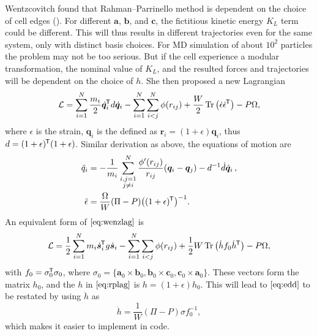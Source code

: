 Wentzcovitch found that Rahman--Parrinello method is dependent on
the choice of cell edges (\cite{Wentzcovitch:1991ka}).
For different $\bm{a}$, $\bm{b}$, and
$\bm{c}$, the fictitious kinetic energy $K_L$ term could be different.
This will thus results in different trajectories even for the same system,
only with distinct basis choices.
For MD simulation of about $10^2$ particles the problem may
not be too serious. But if the cell experience a modular transformation,
the nominal value of $K_L$, and the resulted forces and trajectories
will be dependent on the choice of $h$. She then proposed a new Lagrangian
\begin{equation}\label{eq:wenzlag}
	\mathcal{L} = \sum_{i=1}^{N} \frac{ m_i }{ 2 }\dot{ \bm{q} }_i^{\mkern-1.5mu\mathsf{T}} d \dot{ \bm{q} }_i
	- \sum_{i=1}^{N} \sum_{i<j}^{N} \phi(r_{ij}) + \frac{ W }{ 2 }
	\Tr \big( \dot{ \epsilon } \dot{ \epsilon }^{\mkern-1.5mu\mathsf{T}} \big) - P \Omega,
\end{equation}
where $\epsilon$ is the strain, $\bm{q}_i$ is the defined as
$\bm{r}_i = (1+\epsilon) \bm{q}_i$, thus $d = (1 + \epsilon)^{\mkern-1.5mu\mathsf{T}}
	(1+\epsilon)$.
Similar derivation as above, the equations of motion are
\begin{subequations}
	\begin{align}
		\ddot{q}_i      & = - \frac{ 1 }{ m_i } \sum_{\substack{i, j=1 \\j\neq i}}^{N}
		\frac{ \phi'(r_{ij}) }{ r_{ij} }(\bm{q}_i - \bm{q}_j) - d^{-1} \dot{ d }
		\dot{ \bm{q} }_i \thinspace,                                   \\
		\ddot{\epsilon} & = \frac{ \Omega }{ W } (\Pi - P)
		\big((1+\epsilon)^{\mkern-1.5mu\mathsf{T}}\big)^{-1}.\label{eq:edd}
	\end{align}
\end{subequations}
An equivalent form of $\eqref{eq:wenzlag}$ is
\begin{equation}
	\mathcal{L} = \frac{ 1 }{ 2 } \sum_{i=1}^{N} m_i \dot{ \bm{s} }_i ^{\mkern-1.5mu\mathsf{T}}
	g \dot{ \bm{s} }_i - \sum_{i=1}^{N} \sum_{i<j} \phi (r_{ij}) +
	\frac{ 1 }{ 2 } W \Tr \big(\dot{h} f_0 \dot{h}^{\mkern-1.5mu\mathsf{T}} \big) - P \Omega,
\end{equation}
with $f_0 = \sigma_0 ^{\mkern-1.5mu\mathsf{T}} \sigma_0$, where $\sigma_0 = \{
	\bm{a}_0 \times \bm{b}_0, \bm{b}_0 \times \bm{c}_0,
	\bm{c}_0 \times \bm{a}_0 \}$. These vectors form the matrix $h_0$,
and the $h$ in $\eqref{eq:rplag}$ is $h = (1+\epsilon) h_0$.
This will lead to $\eqref{eq:edd}$ to be restated by using $\ddot{h}$
as
\begin{equation}\label{eq:wenzhdd}
	\ddot{h} = \frac{ 1 }{ W } (\Pi - P) \sigma f_0^{-1},
\end{equation}
which makes it easier to implement in code.

